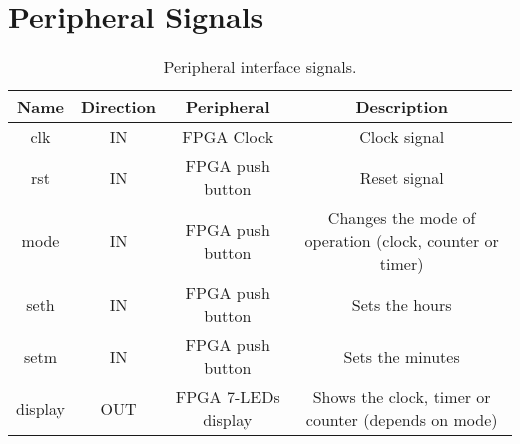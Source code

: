 \section{Peripheral Signals}


\begin{table}[h]
\centering
\caption{Peripheral interface signals.}
\sffamily
    \begin{tabular}{|c|c|c|c|}
        \hline
        
        \textbf{Name} & \textbf{Direction} & \textbf{Peripheral} & \textbf{Description} \\ [0.5ex]
        \hline
        \hline
        
        clk & IN & FPGA Clock & Clock signal \\
        
        \hline
        rst & IN & FPGA push button & Reset signal \\
        \hline
        mode & IN & FPGA push button & Changes the mode of operation (clock, counter or timer) \\
        \hline
        seth & IN & FPGA push button & Sets the hours \\
        \hline
        setm & IN & FPGA push button & Sets the minutes \\
        \hline
        display & OUT & FPGA 7-LEDs display & Shows the clock, timer or counter (depends on mode) \\
         \hline
         
    \end{tabular}
\end{table}